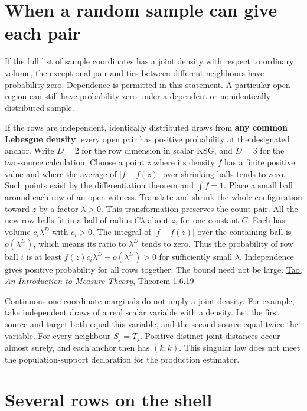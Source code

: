 \section{When a random sample can give each pair}\label{when-a-random-sample-can-give-each-pair}

If the full list of sample coordinates has a joint density with respect to ordinary volume, the exceptional pair and ties between different neighbours have probability zero. Dependence is permitted in this statement. A particular open region can still have probability zero under a dependent or nonidentically distributed sample.

If the rows are independent, identically distributed draws from \textbf{any common Lebesgue density}, every open pair has positive probability at the designated anchor. Write \(D=2\) for the row dimension in scalar KSG, and \(D=3\) for the two-source calculation. Choose a point \(z\) where its density \(f\) has a finite positive value and where the average of \(|f-f(z)|\) over shrinking balls tends to zero. Such points exist by the differentiation theorem and \(\int f=1\). Place a small ball around each row of an open witness. Translate and shrink the whole configuration toward \(z\) by a factor \(\lambda>0\). This transformation preserves the count pair. All the new row balls fit in a ball of radius \(C\lambda\) about \(z\), for one constant \(C\). Each has volume \(c_i\lambda^D\) with \(c_i>0\). The integral of \(|f-f(z)|\) over the containing ball is \(o(\lambda^D)\), which means its ratio to \(\lambda^D\) tends to zero. Thus the probability of row ball \(i\) is at least \(f(z)c_i\lambda^D-o(\lambda^D)>0\) for sufficiently small \(\lambda\). Independence gives positive probability for all rows together. The bound need not be large. \href{https://terrytao.wordpress.com/wp-content/uploads/2012/12/gsm-126-tao5-measure-book.pdf}{Tao, \emph{An Introduction to Measure Theory}, Theorem 1.6.19}

Continuous one-coordinate marginals do not imply a joint density. For example, take independent draws of a real scalar variable with a density. Let the first source and target both equal this variable, and the second source equal twice the variable. For every neighbour \(S_j=T_j\). Positive distinct joint distances occur almost surely, and each anchor then has \((k,k)\). This singular law does not meet the population-support declaration for the production estimator.

\clearpage

\section{Several rows on the shell}\label{several-rows-on-the-shell}


